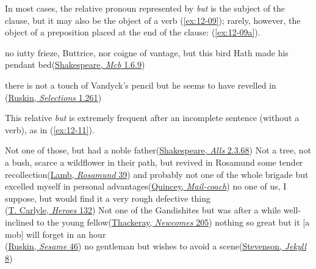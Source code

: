 In most cases, the relative pronoun represented by \textit{but} is the subject of the clause, but it may also be the object of a verb (\ref{ex:12-09}); rarely, however, the object of a preposition placed at the end of the clause: (\ref{ex:12-09a}).

\ea \label{ex:12-09}
no iutty frieze, Buttrice, nor coigne of vantage, but this bird Hath made his pendant bed\hfill(\href{https://internetshakespeare.uvic.ca/doc/Mac_F1/scene/1.6/index.html#tln-440}{Shakespeare, \textit{Mcb} 1.6.9}) %
\z

\ea \label{ex:12-09a}
there is not a touch of Vandyck's pencil but he seems to have revelled in\\\hfill(\href{https://books.google.co.jp/books?id=FFsVAAAAYAAJ&pg=PA279&lpg=PA279&dq=%22touch+of+vandyck%27s+pencil%22&source=bl&ots=a1In7lwdDy&sig=ACfU3U14w7RuGX53hktleahVVxLgOhqEvg&hl=en&sa=X&ved=2ahUKEwjz2ZCg_b2FAxUrr1YBHTteAXcQ6AF6BAgIEAM#v=onepage&q=%22touch%20of%20vandyck's%20pencil%22&f=false}{Ruskin, \textit{Selections} 1.261}) %
\z

This relative \textit{but} is extremely frequent after an incomplete sentence (without a verb), as in (\ref{ex:12-11}).

\ea \label{ex:12-11}
\ea
Not one of those, but had a noble father\hfill(\href{https://internetshakespeare.uvic.ca/doc/AWW_F1/scene/2.3/index.html#tln-955}{Shakespeare, \textit{Alls} 2.3.68})
\ex
Not a tree, not a bush, scarce a wildflower in their path, but revived in Rosamund some tender recollection\hfill(\href{https://archive.org/details/bim_eighteenth-century_a-tale-of-rosamund-gray-_lamb-charles-essayist_1798/page/60/mode/2up?q=%22not+a+tree%22&view=theater}{Lamb, \textit{Rosamund} 39}) %
\ex
and probably not one of the whole brigade but excelled myself in personal advantages\hfill(\href{https://archive.org/details/miscellaneousess00dequuoft/page/142/mode/2up?q=%22whole+brigade%22&view=theater}{Quincey, \textit{Mail-coach}})
\ex
no one of us, I suppose, but would find it a very rough defective thing\\\hfill(\href{https://archive.org/details/heroesheroworshi00carl/page/132/mode/2up?q=%22would+find+it+a+very+rough%22&view=theater}{T. Carlyle, \textit{Heroes} 132}) %
\ex
Not one of the Gandishites but was after a while well-inclined to the young fellow\hfill(\href{https://archive.org/details/newcomes00unkngoog/page/n206/mode/2up?q=%22gandishites%22&view=theater}{Thackeray, \textit{Newcomes} 205}) %
\ex
nothing so great but it [a mob] will forget in an hour\\\hfill(\href{https://archive.org/details/johnruskinssesa00ruskgoog/page/n51/mode/2up?view=theater&q=%22nothing+so+great+but%22}{Ruskin, \textit{Sesame} 46})
\ex
no gentleman but wishes to avoid a scene\hfill(\href{https://archive.org/details/dli.ministry.23383/page/7/mode/2up?q=%22no+gentleman+but%22&view=theater}{Stevenson, \textit{Jekyll} 8})
\z
\z

